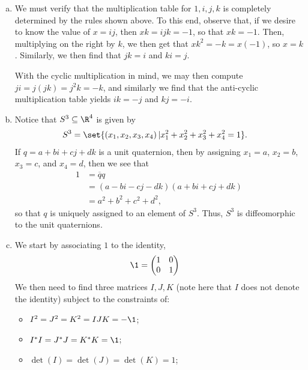 \documentclass[10pt]{mypackage}
\begin{document}
\begin{solution}\hfill
  \begin{enumerate}[(a)]
    \item We must verify that the multiplication table for $ 1,i,j,k $ is completely determined by the rules shown above. To this end, observe that, if we desire to know the value of $ x = ij $, then $ xk = ijk = -1 $, so that $ xk = -1 $. Then, multiplying on the right by $k$, we then get that $ xk^2 = -k = x\left( -1 \right) $, so $x = k$. Similarly, we then find that $ jk = i $ and $ ki = j $.\newline

      With the cyclic multiplication in mind, we may then compute $ ji = j\left( jk \right) =j^2 k = -k$, and similarly we find that the anti-cyclic multiplication table yields $ ik = -j $ and $ kj = -i $.
    \item Notice that $S^{3}\subseteq \R^{4}$ is given by
      \begin{align*}
        S^{3} &= \set{\left( x_1,x_2,x_3,x_4 \right) | x_1^2 + x_2^2 + x_3^2 + x_4^2 = 1}.
      \end{align*}
      If $q = a + bi + cj + dk$ is a unit quaternion, then by assigning $x_1 = a$, $x_2 = b$, $x_3 = c$, and $x_4 = d$, then we see that
      \begin{align*}
        1 &= \overline{q} q\\
          &= \left( a -bi-cj-dk \right)\left( a + bi + cj + dk \right)\\
          &= a^2 + b^2 + c^2 + d^2,
      \end{align*}
      so that $q$ is uniquely assigned to an element of $S^{3}$. Thus, $S^{3}$ is diffeomorphic to the unit quaternions.
    \item We start by associating $1$ to the identity,
      \begin{align*}
        \1 &= \begin{pmatrix}1 & 0 \\ 0 & 1\end{pmatrix}
      \end{align*}
      We then need to find three matrices $I,J,K$ (note here that $I$ does not denote the identity) subject to the constraints of:
      \begin{itemize}
        \item $I^2 = J^2 = K^2 = IJK = -\1$;
        \item $I^{\ast}I = J^{\ast}J = K^{\ast}K = \1$;
        \item $\det\left( I \right) = \det\left( J \right) = \det\left( K \right) = 1$;

\end{itemize}
\end{enumerate}
\end{solution}
\end{document}
